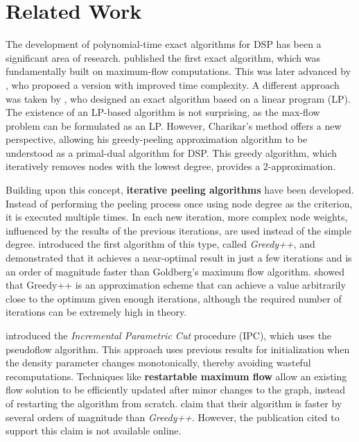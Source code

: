 \section[Related Work]{Related Work}\label{sec:related-work}

The development of polynomial-time exact algorithms for DSP has been a significant area of research.
\textcite{picard_network_1982} published the first exact algorithm, which was fundamentally built on maximum-flow computations.
This was later advanced by \textcite{goldberg_finding_1984}, who proposed a version with improved time complexity.
A different approach was taken by \textcite{charikar_greedy_2000}, who designed an exact algorithm based on a linear program (LP).
The existence of an LP-based algorithm is not surprising, as the max-flow problem can be formulated as an LP.
However, Charikar's method offers a new perspective, allowing his greedy-peeling approximation algorithm to be understood as a primal-dual algorithm for DSP.
This greedy algorithm, which iteratively removes nodes with the lowest degree, provides a 2-approximation.

Building upon this concept, \textbf{iterative peeling algorithms} have been developed.
Instead of performing the peeling process once using node degree as the criterion, it is executed multiple times.
In each new iteration, more complex node weights, influenced by the results of the previous iterations, are used instead of the simple degree.
\textcite{boob_flowless_2020} introduced the first algorithm of this type, called \textit{Greedy++},
and demonstrated that it achieves a near-optimal result in just a few iterations and is an order of magnitude faster than Goldberg's maximum flow algorithm.
\textcite{chekuri_densest_2022} showed that Greedy++ is an approximation scheme that can achieve a value arbitrarily close to the optimum given enough iterations,
although the required number of iterations can be extremely high in theory.

\textcite{hochbaum_flow_2024} introduced the \textit{Incremental Parametric Cut} procedure (IPC), which uses the pseudoflow algorithm\textcite{hochbaum_pseudoflow_2008}.
This approach uses previous results for initialization when the density parameter changes monotonically, thereby avoiding wasteful recomputations.
Techniques like \textbf{restartable maximum flow} allow an existing flow solution to be efficiently updated after minor changes to the graph, instead of restarting the algorithm from scratch.
\textcite{hochbaum_flow_2024} claim that their algorithm is faster by several orders of magnitude than \textit{Greedy++}.
However, the publication cited to support this claim is not available online.


